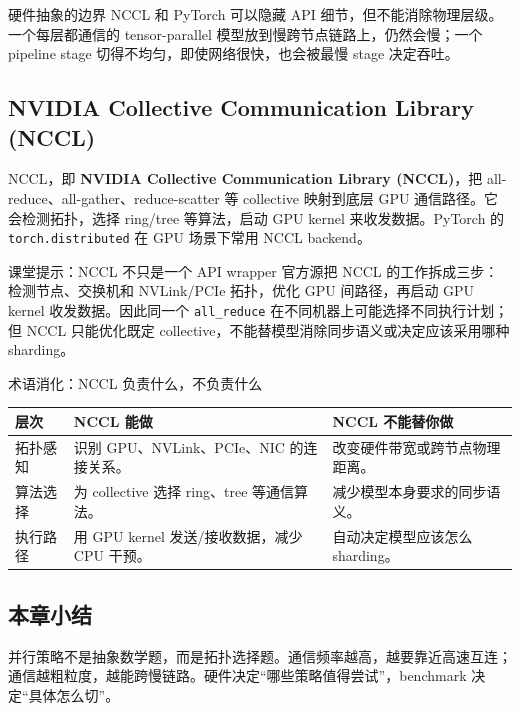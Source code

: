 \documentclass[a4paper]{article}
\newcommand{\code}[1]{\texttt{#1}}
\begin{document}
\begin{importantbox}{硬件抽象的边界}
NCCL 和 PyTorch 可以隐藏 API 细节，但不能消除物理层级。一个每层都通信的 tensor-parallel 模型放到慢跨节点链路上，仍然会慢；一个 pipeline stage 切得不均匀，即使网络很快，也会被最慢 stage 决定吞吐。
\end{importantbox}

\subsection{NVIDIA Collective Communication Library (NCCL)}

NCCL，即 \textbf{NVIDIA Collective Communication Library (NCCL)}，把 all-reduce、all-gather、reduce-scatter 等 collective 映射到底层 GPU 通信路径。它会检测拓扑，选择 ring/tree 等算法，启动 GPU kernel 来收发数据。PyTorch 的 \code{torch.distributed} 在 GPU 场景下常用 NCCL backend。

\begin{knowledgebox}{课堂提示：NCCL 不只是一个 API wrapper}
官方源把 NCCL 的工作拆成三步：检测节点、交换机和 NVLink/PCIe 拓扑，优化 GPU 间路径，再启动 GPU kernel 收发数据。因此同一个 \code{all\_reduce} 在不同机器上可能选择不同执行计划；但 NCCL 只能优化既定 collective，不能替模型消除同步语义或决定应该采用哪种 sharding。
\end{knowledgebox}

\begin{knowledgebox}{术语消化：NCCL 负责什么，不负责什么}
\begin{tabular}{L{0.22\textwidth}L{0.34\textwidth}L{0.34\textwidth}}
\toprule
层次 & NCCL 能做 & NCCL 不能替你做 \\
\midrule
拓扑感知 & 识别 GPU、NVLink、PCIe、NIC 的连接关系。 & 改变硬件带宽或跨节点物理距离。 \\
算法选择 & 为 collective 选择 ring、tree 等通信算法。 & 减少模型本身要求的同步语义。 \\
执行路径 & 用 GPU kernel 发送/接收数据，减少 CPU 干预。 & 自动决定模型应该怎么 sharding。 \\
\bottomrule
\end{tabular}
\end{knowledgebox}

\subsection{本章小结}

并行策略不是抽象数学题，而是拓扑选择题。通信频率越高，越要靠近高速互连；通信越粗粒度，越能跨慢链路。硬件决定“哪些策略值得尝试”，benchmark 决定“具体怎么切”。
\end{document}
